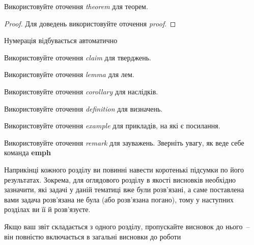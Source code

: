 \begin{theorem}
Використовуйте оточення \emph{theorem} для теорем.
\end{theorem}
\begin{proof}
Для доведень використовуйте оточення \emph{proof}.
\end{proof}
\begin{theorem}
Нумерація відбувається автоматично
\end{theorem}
\begin{claim}
Використовуйте оточення \emph{claim} для тверджень.
\end{claim}
\begin{lemma}
Використовуйте оточення \emph{lemma} для лем.
\end{lemma}
\begin{corollary}
Використовуйте оточення \emph{corollary} для наслідків.
\end{corollary}
\begin{definition}
Використовуйте оточення \emph{definition} для визначень.
\end{definition}
\begin{example}
Використовуйте оточення \emph{example} для прикладів, на які є посилання.
\end{example}
\begin{remark}
Використовуйте оточення \emph{remark} для зауважень. Зверніть увагу, як 
веде себе команда \textbf{emph}
\end{remark}


\chapconclude{\ref{chap:review}}

Наприкінці кожного розділу ви повинні навести коротенькі підсумки по його 
результатах. Зокрема, для оглядового розділу в якості висновків необхідно 
зазначити, які задачі у даній тематиці вже були розв'язані, а саме 
поставлена вами задача розв'язана не була (або розв'язана погано), тому у 
наступних розділах ви її й розв'язуєте.

Якщо ваш звіт складається з одного розділу, пропускайте висновок до 
нього~-- він повністю включається в загальні висновки до роботи
